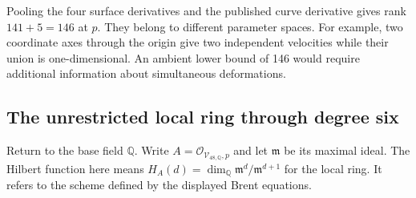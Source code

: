 \documentclass[11pt,reqno]{amsart}
\newcommand{\Q}{\mathbb Q}
\newcommand{\Brent}{\mathcal V}
\begin{document}
Pooling the four surface derivatives and the published curve derivative gives rank \(141+5=146\) at \(p\). They belong to different parameter spaces. For example, two coordinate axes through the origin give two independent velocities while their union is one-dimensional. An ambient lower bound of 146 would require additional information about simultaneous deformations.

\subsection*{The unrestricted local ring through degree six}
Return to the base field \(\Q\). Write \(A=\mathcal O_{\Brent_{48,\Q},p}\) and let \(\mathfrak m\) be its maximal ideal. The Hilbert function here means \(H_A(d)=\dim_{\Q}\mathfrak m^d/\mathfrak m^{d+1}\) for the local ring. It refers to the scheme defined by the displayed Brent equations.
\end{document}
